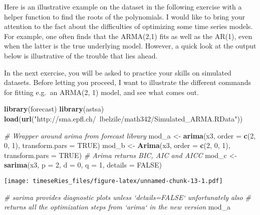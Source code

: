 \documentclass[]{book}
\newenvironment{Shaded}{\begin{snugshade}}{\end{snugshade}}
\newcommand{\KeywordTok}[1]{\textcolor[rgb]{0.13,0.29,0.53}{\textbf{#1}}}
\newcommand{\DataTypeTok}[1]{\textcolor[rgb]{0.13,0.29,0.53}{#1}}
\newcommand{\DecValTok}[1]{\textcolor[rgb]{0.00,0.00,0.81}{#1}}
\newcommand{\StringTok}[1]{\textcolor[rgb]{0.31,0.60,0.02}{#1}}
\newcommand{\CommentTok}[1]{\textcolor[rgb]{0.56,0.35,0.01}{\textit{#1}}}
\newcommand{\OtherTok}[1]{\textcolor[rgb]{0.56,0.35,0.01}{#1}}
\newcommand{\NormalTok}[1]{#1}
\begin{document}
Here is an illustrative example on the dataset in the following exercise
with a helper function to find the roots of the polynomials. I would
like to bring your attention to the fact about the difficulties of
optimizing some time series models. For example, one often finds that
the ARMA(2,1) fits as well as the AR(1), even when the latter is the
true underlying model. However, a quick look at the output below is
illustrative of the trouble that lies ahead.

In the next exercise, you will be asked to practice your skills on
simulated datasets. Before letting you proceed, I want to illustrate the
different commands for fitting e.g.~an ARMA(2, 1) model, and see what
comes out.

\begin{Shaded}
\begin{Highlighting}[]
\KeywordTok{library}\NormalTok{(forecast)}
\KeywordTok{library}\NormalTok{(astsa)}
\KeywordTok{load}\NormalTok{(}\KeywordTok{url}\NormalTok{(}\StringTok{"http://sma.epfl.ch/~lbelzile/math342/Simulated_ARMA.RData"}\NormalTok{))}

\CommentTok{# Wrapper around arima from forecast library}
\NormalTok{mod_a <-}\StringTok{ }\KeywordTok{arima}\NormalTok{(x3, }\DataTypeTok{order =} \KeywordTok{c}\NormalTok{(}\DecValTok{2}\NormalTok{, }\DecValTok{0}\NormalTok{, }\DecValTok{1}\NormalTok{), }\DataTypeTok{transform.pars =} \OtherTok{TRUE}\NormalTok{)}
\NormalTok{mod_b <-}\StringTok{ }\KeywordTok{Arima}\NormalTok{(x3, }\DataTypeTok{order =} \KeywordTok{c}\NormalTok{(}\DecValTok{2}\NormalTok{, }\DecValTok{0}\NormalTok{, }\DecValTok{1}\NormalTok{), }\DataTypeTok{transform.pars =} \OtherTok{TRUE}\NormalTok{)}
\CommentTok{# Arima returns BIC, AIC and AICC}
\NormalTok{mod_c <-}\StringTok{ }\KeywordTok{sarima}\NormalTok{(x3, }\DataTypeTok{p =} \DecValTok{2}\NormalTok{, }\DataTypeTok{d =} \DecValTok{0}\NormalTok{, }\DataTypeTok{q =} \DecValTok{1}\NormalTok{, }\DataTypeTok{details =} \OtherTok{FALSE}\NormalTok{)}
\end{Highlighting}
\end{Shaded}

\texttt{[image: timeseRies\_files/figure-latex/unnamed-chunk-13-1.pdf]}

\begin{Shaded}
\begin{Highlighting}[]
\CommentTok{# sarima provides diagnostic plots unless `details=FALSE` unfortunately also}
\CommentTok{# returns all the optimization steps from `arima` in the new version}
\NormalTok{mod_a}
\end{Highlighting}
\end{Shaded}
\end{document}
